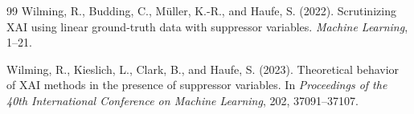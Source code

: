 \documentclass[twoside,11pt]{article}
\begin{document}
\begin{thebibliography}{99}
Wilming, R., Budding, C., M{\"u}ller, K.-R., and Haufe, S. (2022).
Scrutinizing {XAI} using linear ground-truth data with suppressor variables.
\emph{Machine Learning}, 1--21.

Wilming, R., Kieslich, L., Clark, B., and Haufe, S. (2023).
Theoretical behavior of {XAI} methods in the presence of suppressor variables.
In \emph{Proceedings of the 40th International Conference on Machine Learning},
202, 37091--37107.

\end{thebibliography}
\end{document}

